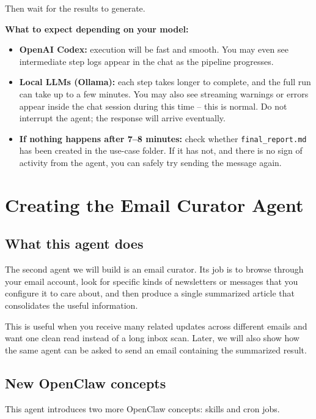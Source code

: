 \documentclass[12pt, a4paper]{article}
\begin{document}
Then wait for the results to generate.

\begin{notebox}
\textbf{What to expect depending on your model:}
\begin{itemize}[leftmargin=1.5em]
\item \textbf{OpenAI Codex:} execution will be fast and smooth. You may even see intermediate step logs appear in the chat as the pipeline progresses.
\item \textbf{Local LLMs (Ollama):} each step takes longer to complete, and the full run can take up to a few minutes. You may also see streaming warnings or errors appear inside the chat session during this time -- this is normal. Do not interrupt the agent; the response will arrive eventually.
\item \textbf{If nothing happens after 7--8 minutes:} check whether \texttt{final\_report.md} has been created in the use-case folder. If it has not, and there is no sign of activity from the agent, you can safely try sending the message again.
\end{itemize}
\end{notebox}

\clearpage

\section{Creating the Email Curator Agent}

\subsection{What this agent does}

The second agent we will build is an email curator. Its job is to browse through your email account, look for specific kinds of newsletters or messages that you configure it to care about, and then produce a single summarized article that consolidates the useful information.

This is useful when you receive many related updates across different emails and want one clean read instead of a long inbox scan. Later, we will also show how the same agent can be asked to send an email containing the summarized result.

\subsection{New OpenClaw concepts}

This agent introduces two more OpenClaw concepts: skills and cron jobs.
\end{document}
